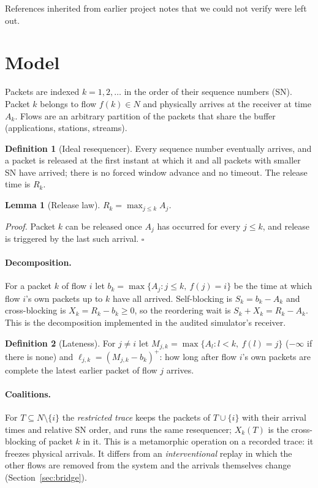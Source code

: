 \documentclass[11pt]{article}
\newtheorem{lemma}{Lemma}
\theoremstyle{definition}
\newtheorem{definition}{Definition}
\begin{document}
References inherited from earlier project notes that we could not verify were left out.

\section{Model}\label{sec:model}
Packets are indexed $k=1,2,\dots$ in the order of their sequence numbers (SN). Packet $k$ belongs to flow $f(k)\in N$ and physically arrives at the receiver at time $A_k$. Flows are an arbitrary partition of the packets that share the buffer (applications, stations, streams).

\begin{definition}[Ideal resequencer]\label{def:ir}
Every sequence number eventually arrives, and a packet is released at the first instant at which it and all packets with smaller SN have arrived; there is no forced window advance and no timeout. The release time is $R_k$.
\end{definition}
\begin{lemma}[Release law]\label{lem:release}
$R_k=\max_{j\le k}A_j$.
\end{lemma}
\emph{Proof.} Packet $k$ can be released once $A_j$ has occurred for every $j\le k$, and release is triggered by the last such arrival. \hfill$\square$

\paragraph{Decomposition.} For a packet $k$ of flow $i$ let $b_k=\max\{A_j:j\le k,\ f(j)=i\}$ be the time at which flow $i$'s own packets up to $k$ have all arrived. Self-blocking is $S_k=b_k-A_k$ and cross-blocking is $X_k=R_k-b_k\ge0$, so the reordering wait is $S_k+X_k=R_k-A_k$. This is the decomposition implemented in the audited simulator's receiver.

\begin{definition}[Lateness]
For $j\ne i$ let $M_{j,k}=\max\{A_l:l<k,\ f(l)=j\}$ ($-\infty$ if there is none) and $\ell_{j,k}=(M_{j,k}-b_k)^+$: how long after flow $i$'s own packets are complete the latest earlier packet of flow $j$ arrives.
\end{definition}
\paragraph{Coalitions.} For $T\subseteq N\setminus\{i\}$ the \emph{restricted trace} keeps the packets of $T\cup\{i\}$ with their arrival times and relative SN order, and runs the same resequencer; $X_k(T)$ is the cross-blocking of packet $k$ in it. This is a metamorphic operation on a recorded trace: it freezes physical arrivals. It differs from an \emph{interventional} replay in which the other flows are removed from the system and the arrivals themselves change (Section~\ref{sec:bridge}).
\end{document}
